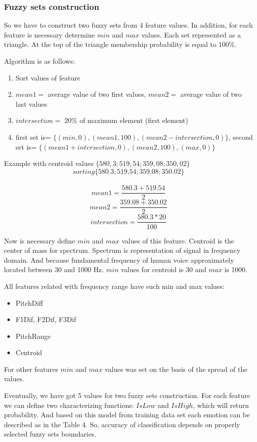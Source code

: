 \documentclass[12pt, letterpaper]{article}
\begin{document}
\subsubsection{Fuzzy sets construction}
So we have to construct two fuzzy sets from 4 feature values. In addition, for each feature is necessary determine $min$ and $max$ values. Each set represented as a triangle. At the top of the triangle membership probability is equal to 100\%. 

Algorithm is as follows:

\begin{enumerate}
	\item Sort values of feature
	\item $mean1=$ average value of two first values, $mean2=$ average value of two last values
	\item $intersection=$ 20\% of maximum element (first element)
	\item first set is= $\{ (min,0) , (mean1, 100) , (mean2-intersection, 0) \}$, second set is= $\{ (mean1+intersection, 0), (mean2, 100) , (max, 0) \}$
\end{enumerate}

Example with centroid values $\{580,3;519,54;359,08;350,02\}$\\
\[ sorting    \{580.3;519.54;359.08;350.02\} \]\\
\[ mean1=\frac{580.3+519.54}{2} \]
\[ mean2=\frac{359.08+350.02}{2}\]
\[intersection=\frac{580.3*20}{100}\]

Now is necessary define $min$ and $max$ values of this feature. Centroid is the center of mass for spectrum. Spectrum is representation of signal in frequency domain. And because fundamental frequency of human voice approximately  located between 30 and 1000 Hz. $min$ values for centroid is 30 and $max$ is 1000.

All features related with frequency range have such min and max values:
\begin{itemize}
	\item PitchDiff
	\item F1Dif, F2Dif, F3Dif
	\item PitchRange
	\item Centroid
\end{itemize}
For other features $min$ and $max$ values was set on the basis of the spread of the values.

Eventually, we have got 5 values for two fuzzy sets construction. For each feature we can define two characterizing functions: $IsLow$ and $IsHigh$, which will return probability. And based on this model from training data set each emotion can be described as in the Table 4. So, accuracy of classification depends on properly selected fuzzy sets boundaries.
\end{document}
